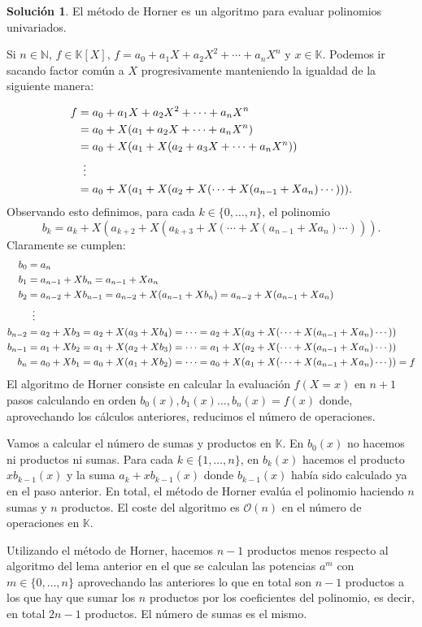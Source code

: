 \documentclass[10pt,a4paper]{article}
\theoremstyle{plain}
\theoremstyle{definition}
\newtheorem*{sol}{Solución}
\begin{document}
\begin{sol}
El método de Horner es un algoritmo para evaluar polinomios univariados.

Si $n\in\mathbb{N}$, $f\in\mathbb{K}[X]$, $f=a_0+a_1X+a_2X^2+\cdots+a_nX^n$ y $x\in \mathbb{K}$. Podemos ir sacando factor común a $X$ progresivamente manteniendo la igualdad de la siguiente manera:

\begin{align*}
f &= a_0+a_1X+a_2X^2+\cdots+a_nX^n\\
&= a_0+X(a_1+a_2X+\cdots+a_nX^n)\\
&= a_0+X(a_1+X(a_2+a_3X+\cdots+a_nX^n))\\
&\vdotswithin{=}   \\
& = a_0+X(a_1+X(a_2+X(\cdots+X(a_{n-1}+Xa_n)\cdots))) 
.\end{align*}
Observando esto definimos, para cada $k\in \{0,\ldots,n\}$, el polinomio $$b_k=a_k+X(a_{k+2}+X(a_{k+3}+X(\cdots +X(a_{n-1}+Xa_n)\cdots))).$$
Claramente se cumplen:
\begin{align*}
b_0 &= a_n\\
b_1 &= a_{n-1}+Xb_n=a_{n-1}+Xa_n\\
b_2 &= a_{n-2}+Xb_{n-1}=a_{n-2}+X(a_{n-1}+Xb_n)=a_{n-2}+X(a_{n-1}+Xa_n)\\
&\vdotswithin{=}\\
b_{n-2} &=a_2+Xb_3=a_2+X(a_3+Xb_4)=\cdots=a_2+X(a_3+X(\cdots+X(a_{n-1}+Xa_n)\cdots))\\
b_{n-1} &=a_1+Xb_2=a_1+X(a_2+Xb_3)=\cdots=a_1+X(a_2+X(\cdots +X(a_{n-1}+Xa_n)\cdots))\\
b_n &=a_0+Xb_1=a_0+X(a_1+Xb_2)=\cdots=a_0+X(a_1+X(\cdots +X(a_{n-1}+Xa_n)\cdots))=f
\end{align*}
El algoritmo de Horner consiste en calcular la evaluación $f\left(X=x\right)$ en $n+1$ pasos calculando en orden $b_0(x),b_1(x)\ldots, b_n(x)=f(x)$ donde, aprovechando los cálculos anteriores, reducimos el número de operaciones.

Vamos a calcular el número de sumas y productos en $\mathbb{K}$.
En $b_0(x)$ no hacemos ni productos ni sumas. Para cada $k\in\{1,\ldots, n\}$, en $b_k(x)$ hacemos el producto $xb_{k-1}(x)$ y la suma $a_k+xb_{k-1}(x)$ donde $b_{k-1}(x)$ había sido calculado ya en el paso anterior. En total, el método de Horner evalúa el polinomio haciendo $n$ sumas y $n$ productos. El coste del algoritmo es $\mathcal{O}(n)$ en el número de operaciones en $\mathbb{K}$.

Utilizando el método de Horner, hacemos $n-1$ productos menos respecto al algoritmo del lema anterior en el que se calculan las potencias $a^m$ con $m\in\{0,\ldots, n\}$ aprovechando las anteriores lo que en total son $n-1$ productos a los que hay que sumar los $n$ productos por los coeficientes del polinomio, es decir, en total $2n-1$ productos. El número de sumas es el mismo.

\end{sol}
\end{document}
